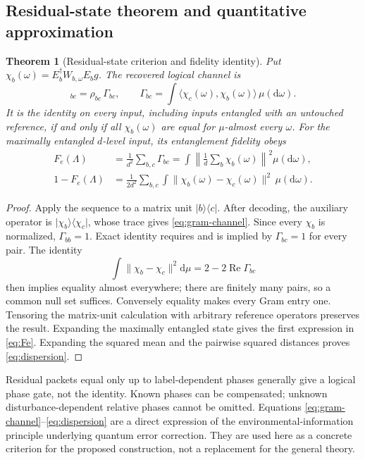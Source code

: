 \documentclass[aip,adv,reprint,onecolumn,amsmath,amssymb]{revtex4-2}
\newcommand{\dd}{\mathrm d}
\newcommand{\ket}[1]{\lvert #1\rangle}
\newcommand{\bra}[1]{\langle #1\rvert}
\newtheorem{theorem}{Theorem}[section]
\begin{document}
\subsection{Residual-state theorem and quantitative approximation}
\begin{theorem}[Residual-state criterion and fidelity identity]
\label{thm:residual}
Put $\chi_b(\omega)=E_b^\dagger W_{b,\omega}E_bg$. The recovered logical channel is
\begin{equation}
 [\Lambda(\rho)]_{bc}=\rho_{bc}\,\Gamma_{bc},\qquad
 \Gamma_{bc}=\int\langle\chi_c(\omega),\chi_b(\omega)\rangle\,\mu(\dd\omega).
 \label{eq:gram-channel}
\end{equation}
It is the identity on every input, including inputs entangled with an untouched reference, if and only if all $\chi_b(\omega)$ are equal for $\mu$-almost every $\omega$. For the maximally entangled $d$-level input, its entanglement fidelity obeys
\begin{align}
 F_e(\Lambda)&=\frac1{d^2}\sum_{b,c}\Gamma_{bc}
 =\int\left\|\frac1d\sum_b\chi_b(\omega)\right\|^2\mu(\dd\omega),\label{eq:Fe}\\
 1-F_e(\Lambda)&=\frac1{2d^2}\sum_{b,c}\int
 \|\chi_b(\omega)-\chi_c(\omega)\|^2\,\mu(\dd\omega).
 \label{eq:dispersion}
\end{align}
\end{theorem}
\begin{proof}
Apply the sequence to a matrix unit $\ket b\bra c$. After decoding, the auxiliary operator is $\ket{\chi_b}\bra{\chi_c}$, whose trace gives \eqref{eq:gram-channel}. Since every $\chi_b$ is normalized, $\Gamma_{bb}=1$. Exact identity requires and is implied by $\Gamma_{bc}=1$ for every pair. The identity
\begin{equation}
 \int\|\chi_b-\chi_c\|^2\dd\mu=2-2\operatorname{Re}\Gamma_{bc}
 \label{eq:pair-distance}
\end{equation}
then implies equality almost everywhere; there are finitely many pairs, so a common null set suffices. Conversely equality makes every Gram entry one. Tensoring the matrix-unit calculation with arbitrary reference operators preserves the result. Expanding the maximally entangled state gives the first expression in \eqref{eq:Fe}. Expanding the squared mean and the pairwise squared distances proves \eqref{eq:dispersion}.
\end{proof}

Residual packets equal only up to label-dependent phases generally give a logical phase gate, not the identity. Known phases can be compensated; unknown disturbance-dependent relative phases cannot be omitted. Equations \eqref{eq:gram-channel}--\eqref{eq:dispersion} are a direct expression of the environmental-information principle underlying quantum error correction.\cite{knill,kribs,nielsen} They are used here as a concrete criterion for the proposed construction, not a replacement for the general theory.
\end{document}
